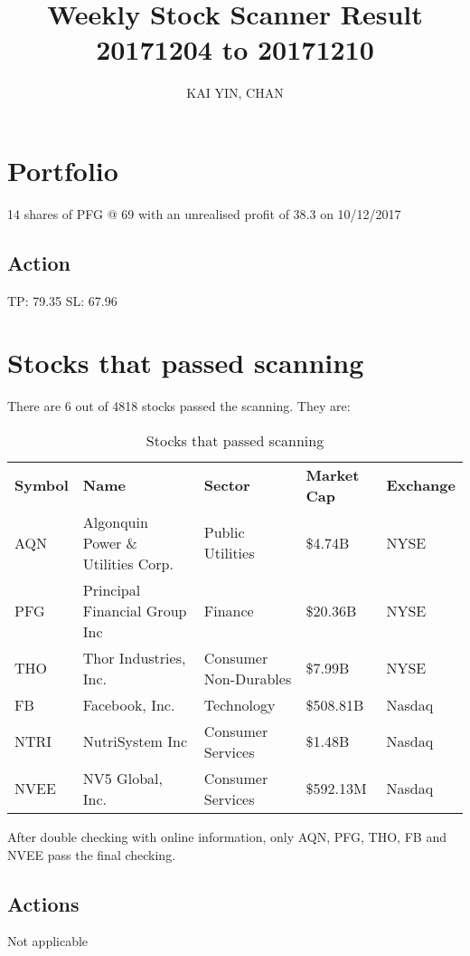 \documentclass{article}
\begin{document}
\title{Weekly Stock Scanner Result \\ 20171204 to 20171210}
\author{KAI YIN, CHAN}
\maketitle

\section{Portfolio}
14 shares of PFG @ 69 with an unrealised profit of 38.3 on 10/12/2017

\subsection{Action}
TP: 79.35 SL: 67.96

\section{Stocks that passed scanning}

There are 6 out of 4818 stocks passed the scanning.  They are:
\begin{table}[htbp]
  \caption{Stocks that passed scanning}
    \begin{tabular}{lllll}
    \textbf{Symbol} & \textbf{Name} & \textbf{Sector} & \textbf{Market Cap} & \textbf{Exchange} \\
    AQN   & Algonquin Power \& Utilities Corp. & Public Utilities & \$4.74B & NYSE \\
    PFG   & Principal Financial Group Inc & Finance & \$20.36B & NYSE \\
    THO   & Thor Industries, Inc. & Consumer Non-Durables & \$7.99B & NYSE \\
    FB    & Facebook, Inc. & Technology & \$508.81B & Nasdaq \\
    NTRI  & NutriSystem Inc & Consumer Services & \$1.48B & Nasdaq \\
    NVEE  & NV5 Global, Inc. & Consumer Services & \$592.13M & Nasdaq \\
    \end{tabular}%
  \label{tab:addlabel}%
\end{table}%

After double checking with online information, only AQN, PFG, THO, FB and NVEE pass the final checking.

\subsection{Actions}
Not applicable
\end{document}
